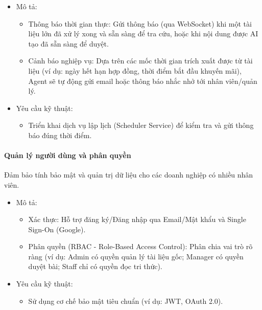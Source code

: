 \begin{itemize}
\item
  Mô tả:

  \begin{itemize}
  \item
    Thông báo thời gian thực: Gửi thông báo (qua WebSocket) khi một tài
    liệu lớn đã xử lý xong và sẵn sàng để tra cứu, hoặc khi nội dung
    được AI tạo đã sẵn sàng để duyệt.
  \item
    Cảnh báo nghiệp vụ: Dựa trên các mốc thời gian trích xuất được từ
    tài liệu (ví dụ: ngày hết hạn hợp đồng, thời điểm bắt đầu khuyến
    mãi), Agent sẽ tự động gửi email hoặc thông báo nhắc nhở tới nhân
    viên/quản lý.
  \end{itemize}
\item
  Yêu cầu kỹ thuật:

  \begin{itemize}
  \item
    Triển khai dịch vụ lập lịch (Scheduler Service) để kiểm tra và gửi
    thông báo đúng thời điểm.
  \end{itemize}
\end{itemize}

\paragraph{Quản lý người dùng và phân
quyền}\label{quux1ea3n-luxfd-ngux1b0ux1eddi-duxf9ng-vuxe0-phuxe2n-quyux1ec1n}

Đảm bảo tính bảo mật và quản trị dữ liệu cho các doanh nghiệp có nhiều
nhân viên.

\begin{itemize}
\item
  Mô tả:

  \begin{itemize}
  \item
    Xác thực: Hỗ trợ đăng ký/Đăng nhập qua Email/Mật khẩu và Single
    Sign-On (Google).
  \item
    Phân quyền (RBAC - Role-Based Access Control): Phân chia vai trò rõ
    ràng (ví dụ: Admin có quyền quản lý tài liệu gốc; Manager có quyền
    duyệt bài; Staff chỉ có quyền đọc tri thức).
  \end{itemize}
\item
  Yêu cầu kỹ thuật:

  \begin{itemize}
  \item
    Sử dụng cơ chế bảo mật tiêu chuẩn (ví dụ: JWT, OAuth 2.0).
  \end{itemize}
\end{itemize}

